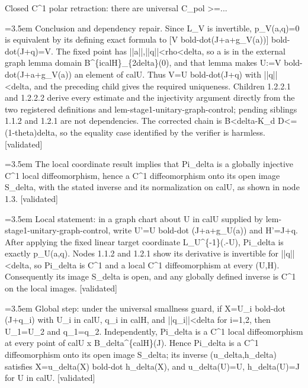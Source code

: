 \documentclass{article}
\newcommand{\step}[1]{\par\noindent\hangindent=3.5em\hangafter=1%
  \makebox[3.5em][l]{\textbf{#1.}}}
\newcommand{\steptag}[1]{\hfill{\small\textsf{[#1]}}}
\begin{document}
\begin{proofbox}{Closed C\textasciicircum{}1 polar retraction: there are universal C\_pol >=...}
\step{1.2.2.3} Conclusion and dependency repair. Since L\_V is invertible, p\_V(a,q)=0 is equivalent by its defining exact formula to [V bold-dot(J+a+g\_V(a))] bold-dot(J+q)=V. The fixed point has ||a||,||q||<rho<delta, so a is in the external graph lemma domain B\textasciicircum{}\{icalH\}\_\{2delta\}(0), and that lemma makes U:=V bold-dot(J+a+g\_V(a)) an element of calU. Thus V=U bold-dot(J+q) with ||q||<delta, and the preceding child gives the required uniqueness. Children 1.2.2.1 and 1.2.2.2 derive every estimate and the injectivity argument directly from the two registered definitions and lem-stage1-unitary-graph-control; pending siblings 1.1.2 and 1.2.1 are not dependencies. The corrected chain is B<delta-K\_d D<=(1-theta)delta, so the equality case identified by the verifier is harmless. \steptag{validated} \\[4pt]
\step{1.3} The local coordinate result implies that Pi\_delta is a globally injective C\textasciicircum{}1 local diffeomorphism, hence a C\textasciicircum{}1 diffeomorphism onto its open image S\_delta, with the stated inverse and its normalization on calU, as shown in node 1.3. \steptag{validated} \\[6pt]
\step{1.3.1} Local statement: in a graph chart about U in calU supplied by lem-stage1-unitary-graph-control, write U'=U bold-dot (J+a+g\_U(a)) and H'=J+q. After applying the fixed linear target coordinate L\_U\textasciicircum{}\{-1\}(.-U), Pi\_delta is exactly p\_U(a,q). Nodes 1.1.2 and 1.2.1 show its derivative is invertible for ||q||<delta, so Pi\_delta is C\textasciicircum{}1 and a local C\textasciicircum{}1 diffeomorphism at every (U,H). Consequently its image S\_delta is open, and any globally defined inverse is C\textasciicircum{}1 on the local images. \steptag{validated} \\[4pt]
\step{1.3.2} Global step: under the universal smallness guard, if X=U\_i bold-dot (J+q\_i) with U\_i in calU, q\_i in calH, and ||q\_i||<delta for i=1,2, then U\_1=U\_2 and q\_1=q\_2. Independently, Pi\_delta is a C\textasciicircum{}1 local diffeomorphism at every point of calU x B\_delta\textasciicircum{}\{calH\}(J). Hence Pi\_delta is a C\textasciicircum{}1 diffeomorphism onto its open image S\_delta; its inverse (u\_delta,h\_delta) satisfies X=u\_delta(X) bold-dot h\_delta(X), and u\_delta(U)=U, h\_delta(U)=J for U in calU. \steptag{validated} \\[6pt]

\end{proofbox}
\end{document}
